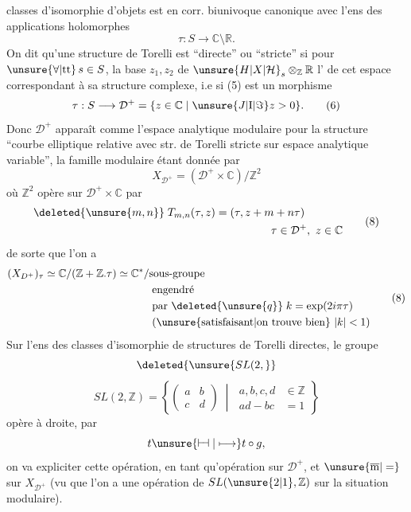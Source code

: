 classes d'isomorphie d'objets  est en corr. biunivoque canonique avec l'ens des applications holomorphes
\makeatletter\tagsleft@true\makeatother
\[
\tau:S\longrightarrow\mathbb C\setminus\mathbb R . \tag*{(5)}
\]
On dit qu'une structure de Torelli est ``directe'' ou ``stricte'' si  pour $\unsure{\forall|\mathrm{tt}}\,s\in S$, la base  $z_1,z_2$ de $\unsure{H|X|\mathcal H}_s\otimes_{\mathbb Z}\mathbb R$  l' de cet espace correspondant à sa structure complexe, i.e si (5) est un morphisme
\[
\tau:S\longrightarrow\mathcal D^+=\{z\in\mathbb C\mid\unsure{J|\mathrm I|\Im}z>0\}. \tag*{(6)}
\]
Donc $\mathcal D^+$ apparaît comme l'espace analytique modulaire pour la structure ``courbe elliptique relative avec str. de Torelli stricte sur espace analytique variable'', la famille modulaire étant donnée par
\[
X_{\mathcal D^+}=(\mathcal D^+\times\mathbb C)/\mathbb Z^2 \tag*{(7)}
\]
où $\mathbb Z^2$ opère sur $\mathcal D^+\times\mathbb C$ par
\[
\begin{aligned}
\deleted{\unsure{m,n}}\;T_{m,n}(\tau,z)&=(\tau,z+m+n\tau)\\
&\hspace{5em}\tau\in\mathcal D^+,\ z\in\mathbb C
\end{aligned}\tag*{(8)}
\]
de sorte que l'on a
\[
\begin{aligned}
(X_{D^+})_\tau &\simeq \mathbb C/(\mathbb Z+\mathbb Z.\tau)\simeq\mathbb C^*/\text{sous-groupe}\\
&\hspace{10em}\text{engendré}\\
&\hspace{10em}\text{par }\deleted{\unsure{q}}\;k=\exp(2i\pi\tau)\\
&\hspace{10em}\text{(\unsure{satisfaisant|on trouve bien} }|k|<1\text{)}
\end{aligned}\tag*{(8)}
\]
Sur l'ens des  classes d'isomorphie de structures de Torelli directes, le groupe
\[
\deleted{\unsure{SL(2,}}
\]
\[
SL(2,\mathbb Z)=\left\{\begin{pmatrix}a&b\\c&d\end{pmatrix}\;\middle|\;
\begin{aligned}a,b,c,d&\in\mathbb Z\\ad-bc&=1\end{aligned}\right\} \tag*{(9)}
\]
opère à droite, par
\[
t\unsure{\mathrel{\vdash\!\dashv}|\longmapsto}t\circ g,
\]
on va expliciter cette opération, en tant qu'opération sur $\mathcal D^+$, et $\unsure{\overline{\mathrm m}|=}$ sur $X_{\mathcal D^+}$ (vu que l'on a une opération de $SL(\unsure{2|1},\mathbb Z)$ sur la situation modulaire).

